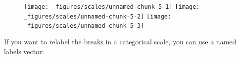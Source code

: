 \begin{Shaded}
\begin{Highlighting}[]
\StringTok{ } \StringTok{ }
\StringTok{  }\NormalTok{() +}\StringTok{ }
\StringTok{  }\NormalTok{(} \NormalTok{, } \NormalTok{)}
\StringTok{ }\NormalTok{(} \NormalTok{(}\NormalTok{, }\NormalTok{))}
\StringTok{ }\NormalTok{(} \NormalTok{(}\NormalTok{, }\NormalTok{), } \NormalTok{(}\NormalTok{, }\NormalTok{))}
\end{Highlighting}
\end{Shaded}

\begin{figure}[H]
  \texttt{[image: \_figures/scales/unnamed-chunk-5-1]}%
  \texttt{[image: \_figures/scales/unnamed-chunk-5-2]}%
  \texttt{[image: \_figures/scales/unnamed-chunk-5-3]}
\end{figure}

If you want to relabel the breaks in a categorical scale, you can use a
named labels vector:

\begin{Shaded}
\begin{Highlighting}[]
\StringTok{ }\NormalTok{(} \NormalTok{:}\NormalTok{, } \NormalTok{(}\NormalTok{, }\NormalTok{, }\NormalTok{))}
\StringTok{ }
\StringTok{  }\NormalTok{()}
\StringTok{ }
\StringTok{  }\NormalTok{() +}\StringTok{ }
\StringTok{  }\NormalTok{(} \NormalTok{(} \NormalTok{, } \NormalTok{, } \NormalTok{))}
\end{Highlighting}
\end{Shaded}

